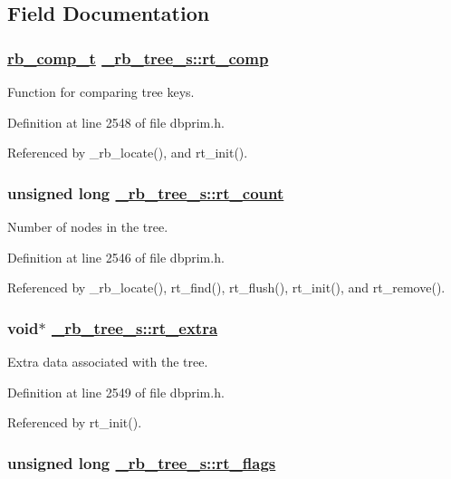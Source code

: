 \subsection{Field Documentation}
\hypertarget{struct__rb__tree__s_o4}{
\subsubsection[rt\_\-comp]{\setlength{\rightskip}{0pt plus 5cm}\hyperlink{group__dbprim__rbtree_ga3}{rb\_\-comp\_\-t} \hyperlink{struct__rb__tree__s_o4}{\_\-rb\_\-tree\_\-s::rt\_\-comp}}}
\label{struct__rb__tree__s_o4}


Function for comparing tree keys. 

Definition at line 2548 of file dbprim.h.

Referenced by \_\-rb\_\-locate(), and rt\_\-init().\hypertarget{struct__rb__tree__s_o2}{
\subsubsection[rt\_\-count]{\setlength{\rightskip}{0pt plus 5cm}unsigned long \hyperlink{struct__rb__tree__s_o2}{\_\-rb\_\-tree\_\-s::rt\_\-count}}}
\label{struct__rb__tree__s_o2}


Number of nodes in the tree. 

Definition at line 2546 of file dbprim.h.

Referenced by \_\-rb\_\-locate(), rt\_\-find(), rt\_\-flush(), rt\_\-init(), and rt\_\-remove().\hypertarget{struct__rb__tree__s_o5}{
\subsubsection[rt\_\-extra]{\setlength{\rightskip}{0pt plus 5cm}void$\ast$ \hyperlink{struct__rb__tree__s_o5}{\_\-rb\_\-tree\_\-s::rt\_\-extra}}}
\label{struct__rb__tree__s_o5}


Extra data associated with the tree. 

Definition at line 2549 of file dbprim.h.

Referenced by rt\_\-init().\hypertarget{struct__rb__tree__s_o1}{
\subsubsection[rt\_\-flags]{\setlength{\rightskip}{0pt plus 5cm}unsigned long \hyperlink{struct__rb__tree__s_o1}{\_\-rb\_\-tree\_\-s::rt\_\-flags}}}
\label{struct__rb__tree__s_o1}


